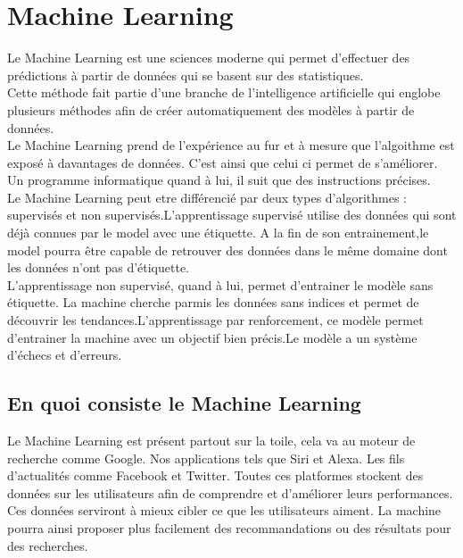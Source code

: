 \documentclass[10pt,a4paper]{article}
\begin{document}
\section{Machine Learning}

Le Machine Learning est une sciences moderne qui permet d'effectuer des prédictions à partir de données qui se basent sur des statistiques. \\

Cette méthode fait partie d'une branche de l'intelligence artificielle qui englobe plusieurs méthodes afin de créer automatiquement des modèles à partir de données. \\

Le Machine Learning prend de l'expérience au fur et à mesure que l'algoithme est exposé à davantages de données. C'est ainsi que celui ci permet de s'améliorer. Un programme informatique quand à lui, il suit que des instructions précises.\\

Le Machine Learning peut etre différencié par deux types d'algorithmes : supervisés et non supervisés.L'apprentissage supervisé utilise des données qui sont déjà connues par le model avec une étiquette. A la fin de son entrainement,le model pourra être capable de retrouver des données dans le même domaine dont les données n'ont pas d'étiquette.\\

L'apprentissage non supervisé, quand à lui, permet d'entrainer le modèle sans étiquette. La machine cherche parmis les données sans indices et permet de découvrir les tendances.L'apprentissage par renforcement, ce modèle permet d'entrainer la machine avec un objectif bien précis.Le modèle a un système d'échecs et d'erreurs. \\


\subsection{En quoi consiste le Machine Learning}

Le Machine Learning est présent partout sur la toile, cela va au moteur de recherche comme Google. Nos applications tels que Siri et Alexa. Les fils d'actualités comme Facebook et Twitter. Toutes ces platformes stockent des données sur les utilisateurs afin de comprendre et d'améliorer leurs performances. Ces données serviront à mieux cibler ce que les utilisateurs aiment. La machine pourra ainsi proposer plus facilement des recommandations ou des résultats pour des recherches.
\end{document}
